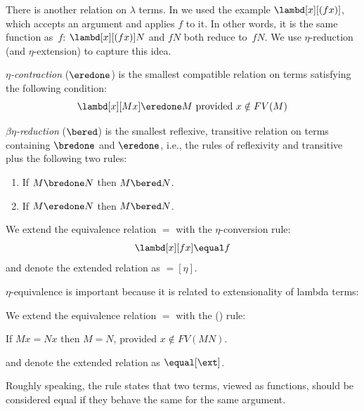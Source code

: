 \documentclass[../../../include/open-logic-section]{subfiles}
\begin{document}

There is another relation on $\lambda$ terms. In  we
used the example $\lambd[x][(fx)]$, which accepts an argument and
applies $f$ to it.  In other words, it is the same function as~$f$:
$\lambd[x][(fx)]N$ and $fN$ both reduce to~$fN$.  We use
$\eta$-reduction (and $\eta$-extension) to capture this idea.

\begin{defn}
  \emph{$\eta$-contraction} ($\eredone$) is the smallest compatible relation
  on terms satisfying the following condition:
  \[
    \lambd[x][M x] \eredone M \text{ provided } x \notin FV(M)
  \]
\end{defn}

\begin{defn} 
  \emph{$\beta\eta$-reduction} ($\bered$) is the smallest reflexive,
  transitive relation on terms containing $\bredone$ and $\eredone$,
  i.e., the rules of reflexivity and transitive plus the following two
  rules:
  \begin{enumerate}
  \item If $M \bredone N$ then $M \bered N$. 
  \item If $M \eredone N$ then $M \bered N$. 
  \end{enumerate}
    
\end{defn}

\begin{defn}
  We extend the equivalence relation $\equal$ with the $\eta$-conversion rule:
  \[
  \lambd[x][f x] \equal f
  \]
  and denote the extended relation as $\equal[\eta]$.
\end{defn}

$\eta$-equivalence is important because it is related to extensionality
of lambda terms:

\begin{defn}[Extensionality]
  We extend the equivalence relation $\equal$ with the (\ext) rule:
  \begin{center}
  If $Mx \equal Nx$ then $M \equal N$, provided $x \notin FV(MN)$.
  \end{center}
  and denote the extended relation as $\equal[\ext]$.
\end{defn}

Roughly speaking, the rule states that two terms, viewed as functions,
should be considered equal if they behave the same for the same
argument.
\end{document}
